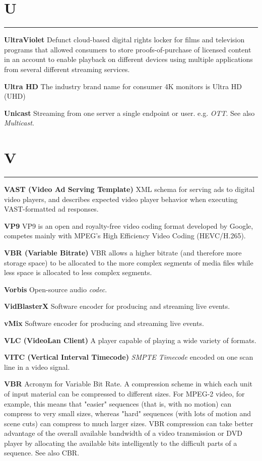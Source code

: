 \section{U}
\hrule

\medskip
\textbf{UltraViolet}
Defunct cloud-based digital rights locker for films and television programs that allowed consumers to store proofs-of-purchase of licensed content in an account to enable playback on different devices using multiple applications from several different streaming services.

\smallskip
\textbf{Ultra HD}
The industry brand name for consumer 4K monitors is Ultra HD (UHD)

\smallskip
\textbf{Unicast}
Streaming from one server a single endpoint or user. e.g. \textit{OTT}.  See also \textit{Multicast}.


\section{V}
\hrule

\medskip
\textbf{VAST (Video Ad Serving Template)}
XML schema for serving ads to digital video players, and describes expected video player behavior when executing VAST-formatted ad responses.

\smallskip
\textbf{VP9}
VP9 is an open and royalty-free video coding format developed by Google, competes mainly with MPEG's High Efficiency Video Coding (HEVC/H.265).

\smallskip
\textbf{VBR (Variable Bitrate)}
VBR allows a higher bitrate (and therefore more storage space) to be allocated to the more complex segments of media files while less space is allocated to less complex segments.

\smallskip
\textbf{Vorbis}
Open-source audio \textit{codec}.

\smallskip
\textbf{VidBlasterX}
Software encoder for producing and streaming live events.

\smallskip
\textbf{vMix}
Software encoder for producing and streaming live events.

\smallskip
\textbf{VLC (VideoLan Client)}
A player capable of playing a wide variety of formats.

\smallskip
\textbf{VITC (Vertical Interval Timecode)}
\textit{SMPTE} \textit{Timecode} encoded on one scan line in a video signal.

\smallskip
\textbf{VBR}
Acronym for Variable Bit Rate. A compression scheme in which each unit of input material can be compressed to different sizes. For MPEG-2 video, for example, this means that "easier" sequences (that is, with no motion) can compress to very small sizes, whereas "hard" sequences (with lots of motion and scene cuts) can compress to much larger sizes. VBR compression can take better advantage of the overall available bandwidth of a video transmission or DVD player by allocating the available bits intelligently to the difficult parts of a sequence. See also CBR.

